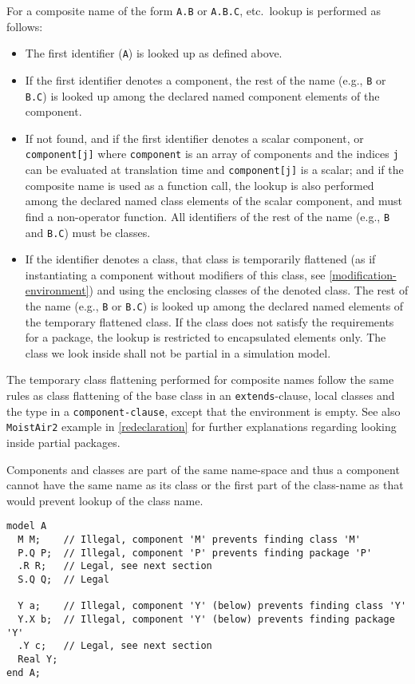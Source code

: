 For a composite name of the form \lstinline!A.B! or \lstinline!A.B.C!, etc.\ lookup is performed as follows:
\begin{itemize}
\item
  The first identifier (\lstinline!A!) is looked up as defined above.
\item
  If the first identifier denotes a component, the rest of the name (e.g., \lstinline!B! or \lstinline!B.C!) is looked up among the declared named component elements of the component.
\item
  If not found, and if the first identifier denotes a scalar component, or \lstinline!component[j]! where \lstinline!component! is an array of components and the indices \lstinline!j! can be evaluated at translation time and \lstinline!component[j]! is a scalar; and if the composite name is used as a function call, the lookup is also performed among the declared named class elements of the scalar component, and must find a non-operator function.
  All identifiers of the rest of the name (e.g., \lstinline!B! and \lstinline!B.C!) must be classes.
\item
  If the identifier denotes a class, that class is temporarily flattened (as if instantiating a component without modifiers of this class, see \cref{modification-environment}) and using the enclosing classes of the denoted class.
  The rest of the name (e.g., \lstinline!B! or \lstinline!B.C!) is looked up among the declared named elements of the temporary flattened class.
  If the class does not satisfy the requirements for a package, the lookup is restricted to encapsulated elements only.
  The class we look inside shall not be partial in a simulation model.
\end{itemize}

\begin{nonnormative}
The temporary class flattening performed for composite names follow the same rules as class flattening of the base class in an \lstinline!extends!-clause, local classes and the type in a \lstinline[language=grammar]!component-clause!, except that the environment is empty.
See also \lstinline!MoistAir2! example in \cref{redeclaration} for further explanations regarding looking inside partial packages.
\end{nonnormative}
\begin{example}
Components and classes are part of the same name-space and thus a component cannot have the same name as its class or the first part of the class-name as that would prevent lookup of the class name.
\begin{lstlisting}[language=modelica]
model A
  M M;    // Illegal, component 'M' prevents finding class 'M'
  P.Q P;  // Illegal, component 'P' prevents finding package 'P'
  .R R;   // Legal, see next section
  S.Q Q;  // Legal

  Y a;    // Illegal, component 'Y' (below) prevents finding class 'Y'
  Y.X b;  // Illegal, component 'Y' (below) prevents finding package 'Y'
  .Y c;   // Legal, see next section
  Real Y;
end A;
\end{lstlisting}
\end{example}


